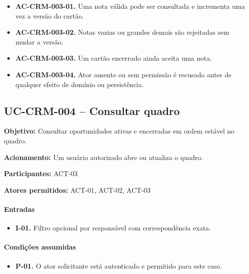 \documentclass[10pt,a4paper]{article}
\begin{document}
\begin{itemize}

\item \textbf{AC-CRM-003-01.} Uma nota válida pode ser consultada e incrementa uma vez a versão do cartão.

\item \textbf{AC-CRM-003-02.} Notas vazias ou grandes demais são rejeitadas sem mudar a versão.

\item \textbf{AC-CRM-003-03.} Um cartão encerrado ainda aceita uma nota.

\item \textbf{AC-CRM-003-04.} Ator ausente ou sem permissão é recusado antes de qualquer efeito de domínio ou persistência.

\end{itemize}

\subsection{UC-CRM-004 -- Consultar quadro}

\textbf{Objetivo:} Consultar oportunidades ativas e encerradas em ordem estável no quadro.

\textbf{Acionamento:} Um usuário autorizado abre ou atualiza o quadro.

\textbf{Participantes:} ACT-03

\textbf{Atores permitidos:} ACT-01, ACT-02, ACT-03

\paragraph{Entradas}

\begin{itemize}

\item \textbf{I-01.} Filtro opcional por responsável com correspondência exata.

\end{itemize}

\paragraph{Condições assumidas}

\begin{itemize}

\item \textbf{P-01.} O ator solicitante está autenticado e permitido para este caso.

\end{itemize}
\end{document}
